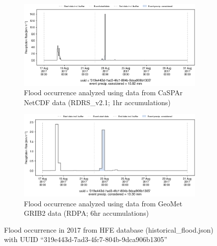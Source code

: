 \documentclass[10pt,a4paper,titlepage,parskip]{scrartcl}
\begin{document}
\begin{figure}[h]
	\begin{subfigure}[a]{1.0\textwidth}
		\centering
		\includegraphics[width=\linewidth]{figures/compare_Geomet_CaSPAr/interpolated_at_stations_occurrence_1036_identified-timesteps_RDRS_v2.1.png}
		\caption{Flood occurrence analyzed using data from CaSPAr NetCDF data (RDRS\_v2.1; 1hr accumulations)}
	\end{subfigure}
	\par\bigskip\bigskip
	\begin{subfigure}[b]{1.0\textwidth}
		\centering
		\includegraphics[width=\linewidth]{figures/compare_Geomet_CaSPAr/interpolated_at_stations_occurrence_1036_identified-timesteps_rdpa:10km:6f.png}
		\caption{Flood occurrence analyzed using data from GeoMet GRIB2 data (RDPA; 6hr accumulations)}
	\end{subfigure}
	\par\bigskip\bigskip
	\caption{Flood occurrence in 2017 from HFE database (historical\_flood.json) with UUID ``319e443d-7ad3-4fc7-804b-9dca906b1305''}
\end{figure}
\pagebreak
\end{document}
